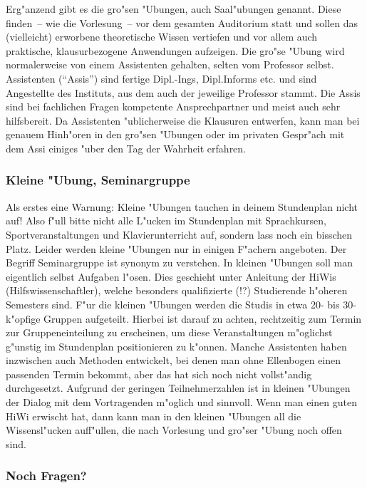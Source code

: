 Erg"anzend gibt es die gro"sen "Ubungen, auch Saal"ubungen genannt. Diese
finden~-- wie die Vorlesung~-- vor dem gesamten Auditorium statt und sollen das
(vielleicht) erworbene theoretische Wissen vertiefen und vor allem auch
praktische, klausurbezogene Anwendungen aufzeigen. Die gro"se "Ubung wird
normalerweise von einem Assistenten gehalten, selten vom Professor selbst.
Assistenten ("`Assis"') sind fertige Dipl.-Ings, Dipl.Informs etc. und sind
Angestellte des Instituts, aus dem auch der jeweilige Professor stammt. Die
Assis sind bei fachlichen Fragen kompetente Ansprechpartner und meist auch sehr
hilfsbereit. Da Assistenten "ublicherweise die Klausuren entwerfen, kann man
bei genauem Hinh"oren in den gro"sen "Ubungen oder im privaten Gespr"ach mit
dem Assi einiges "uber den Tag der Wahrheit erfahren.


\subsubsection*{Kleine "Ubung, Seminargruppe}

Als erstes eine Warnung: Kleine "Ubungen tauchen in deinem Stundenplan nicht auf!
Also f"ull bitte nicht alle L"ucken im
Stundenplan mit Sprachkursen, Sportveranstaltungen und Klavierunterricht auf,
sondern lass noch ein bisschen Platz. Leider werden kleine "Ubungen nur in
einigen F"achern angeboten. Der Begriff Seminargruppe ist synonym zu verstehen.
In kleinen "Ubungen soll man eigentlich selbst Aufgaben l"osen. Dies geschieht
unter Anleitung der HiWis (Hilfswissenschaftler), welche besonders qualifizierte
(!?) Studierende h"oheren Semesters sind. F"ur die kleinen "Ubungen werden die
Studis in etwa 20- bis 30-k"opfige Gruppen aufgeteilt. Hierbei ist darauf zu
achten, rechtzeitig zum Termin zur Gruppeneinteilung zu erscheinen, um diese
Veranstaltungen m"oglichst g"unstig im Stundenplan positionieren zu k"onnen.
Manche Assistenten haben inzwischen auch Methoden entwickelt, bei denen man
ohne Ellenbogen einen passenden Termin bekommt, aber das hat sich noch nicht
vollst"andig durchgesetzt. Aufgrund der geringen Teilnehmerzahlen ist in
kleinen "Ubungen der Dialog mit dem Vortragenden m"oglich und sinnvoll. Wenn
man einen guten HiWi erwischt hat, dann kann man in den kleinen "Ubungen all
die Wissensl"ucken auff"ullen, die nach Vorlesung und gro"ser "Ubung noch offen
sind.


\subsubsection*{Noch Fragen?}

